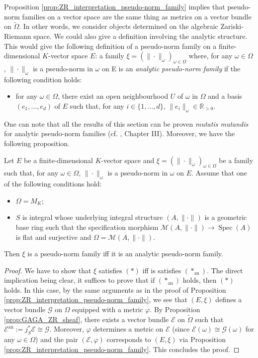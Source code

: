 \documentclass [11pt,reqno]{amsart}
\def\bR{{\mathbb{R}}}
\newcommand{\1}{\mathmybb{1}}
\def\cE{{\mathcal{E}}}
\def\cG{{\mathcal{G}}}
\def\cM{{\mathcal{M}}}
\def\an{\operatorname{an}}
\def\Spec{\operatorname{Spec}}
\def\tilde{\widetilde}
\begin{document}
Proposition \ref{prop:ZR_interpretation_pseudo-norm_family} implies that pseudo-norm families on a vector space are the same thing as metrics on a vector bundle on $\tilde{\Omega}$. In other words, we consider objects determined on the algebraic Zariski-Riemann space. We could also give a definition involving the analytic structure. This would give the following definition of a pseudo-norm family on a finite-dimensional $K$-vector space $E$: a family $\xi =(\|\cdot\|_{\omega})_{\omega\in \Omega}$ where, for any $\omega\in \Omega$, $\|\cdot\|_\omega$ is a pseudo-norm in $\omega$ on E is an \emph{analytic pseudo-norm family} if the following condition holds: 
\begin{itemize}
	\item[($\ast_{\an}$)] for any $\omega\in \Omega$, there exist an open neighbourhood $U$ of $\omega$ in $\Omega$ and a basis $(e_1,...,e_d)$ of $E$ such that, for any $i\in\{1,...,d\}$, $\|e_i\|_{\omega} \in \bR_{>0}$. 
\end{itemize}
One can note that all the results of this section can be proven \emph{mutatis mutandis} for analytic pseudo-norm families (cf. \cite{Sedillotthese}, Chapter III). Moreover, we have the following proposition.

\begin{proposition}
\label{prop:ZR_interpretation_pseudo-norm_families_GAGA}
Let $E$ be a finite-dimensional $K$-vector space and $\xi=(\|\cdot\|_{\omega})_{\omega\in\Omega}$ be a family such that, for any $\omega\in\Omega$, $\|\cdot\|_{\omega}$ is a pseudo-norm in $\omega$ on $E$. Assume that one of the following conditions hold:
\begin{itemize}
	\item[(1)] $\Omega=M_{K}$;
	\item[(2)] $S$ is integral whose underlying integral structure $(A,\|\cdot\|)$ is a geometric base ring such that the specification morphism $\cM(A,\|\cdot\|)\to\Spec(A)$ is flat and surjective and $\Omega=\cM(A,\|\cdot\|)$.
\end{itemize}
Then $\xi$ is a pseudo-norm family iff it is an analytic pseudo-norm family.
\end{proposition}

\begin{proof}
We have to show that $\xi$ satisfies $(\ast)$ iff is satisfies $(\ast_{\an})$. The direct implication being clear, it suffices to prove that if $(\ast_{\an})$ holds, then $(\ast)$ holds. In this case, by the same arguments as in the proof of Proposition \ref{prop:ZR_interpretation_pseudo-norm_family}, we see that $(E,\xi)$ defines a vector bundle $\cG$ on $\Omega$ equipped with a metric $\varphi$. By Proposition \ref{prop:GAGA_ZR_sheaf}, there exists a vector bundle $\cE$ on $\tilde{\Omega}$ such that $\cE^{\an}:=j_{S}^{\ast}\cE \cong \cG$. Moreover, $\varphi$ determines a metric on $\cE$ (since $\cE(\omega)\cong\cG(\omega)$ for any $\omega\in\Omega$) and the pair $(\cE,\varphi)$ corresponds to $(E,\xi)$ via Proposition \ref{prop:ZR_interpretation_pseudo-norm_family}. This concludes the proof.
\end{proof}
\end{document}
